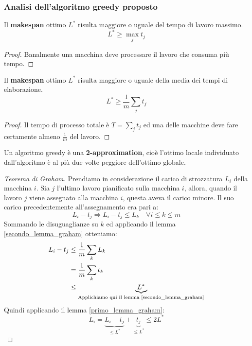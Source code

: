 \documentclass[\main/main.tex]{subfiles}
\begin{document}
\subsubsection{Analisi dell'algoritmo greedy proposto}
\begin{lemma}
	Il \textbf{makespan} ottimo \(L^*\) risulta maggiore o uguale del tempo di lavoro massimo.
	\[
		L^* \geq \max_{j} t_j
	\]
	\label{primo_lemma_graham}
\end{lemma}
\begin{proof}
	Banalmente una macchina deve processare il lavoro che consuma più tempo.
\end{proof}
\begin{lemma}
	Il  \textbf{makespan} ottimo \(L^*\) risulta maggiore o uguale della media dei tempi di elaborazione.
	\[
		L^* \geq \frac{1}{m} \sum_{j} t_j
	\]
	\label{secondo_lemma_graham}
\end{lemma}
\begin{proof}
	Il tempo di processo totale è \(T = \sum_{j} t_j\) ed una delle macchine deve fare certamente almeno \(\frac{1}{m}\) del lavoro.
\end{proof}
\begin{theorem}
	Un algoritmo greedy è una \textbf{2-approximation}, cioè l'ottimo locale individuato dall'algoritmo è al più due volte peggiore dell'ottimo globale.
	\label{graham_theorem}
\end{theorem}
\begin{proof}[Teorema di Graham]
	Prendiamo in considerazione il carico di strozzatura \(L_i\) della macchina \(i\). Sia \(j\) l'ultimo lavoro pianificato sulla macchina \(i\), allora, quando il lavoro \(j\) viene assegnato alla macchina \(i\), questa aveva il carico minore. Il suo carico precedentemente all'assegnamento era pari a:
	\[
		L_i - t_j \Rightarrow L_i - t_j \leq L_k \quad \forall i \leq k \leq m
	\]
	Sommando le disuguaglianze su \(k\) ed applicando il lemma \ref{secondo_lemma_graham} otteniamo:
	\begin{align*}
		L_i - t_j & \leq \frac{1}{m} \sum_{k} L_k                                                       \\
		          & = \frac{1}{m} \sum_{k} t_k                                                          \\
		          & \leq \underbrace{ L^*}_{\text{Applichiamo qui il lemma \ref{secondo_lemma_graham}}}
	\end{align*}
	Quindi applicando il lemma \ref{primo_lemma_graham}:
	\[
		L_i = \underbrace{L_i - t_j}_{\leq L^*} + \underbrace{t_j}_{\leq L^*} \leq 2L^*
	\]
\end{proof}
\end{document}
